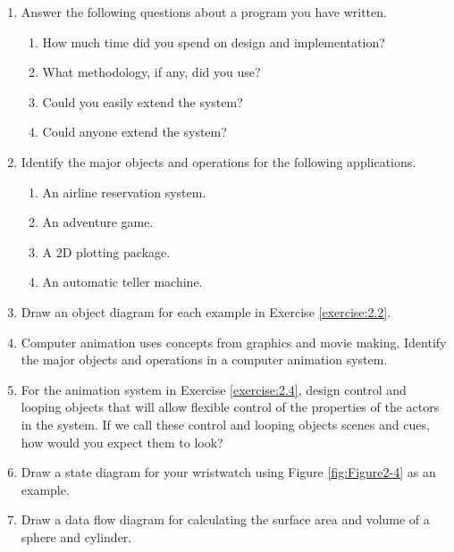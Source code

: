 \begin{enumerate}
	\item Answer the following questions about a program you have written.
	\begin{enumerate}
		\item How much time did you spend on design and implementation?
		\item What methodology, if any, did you use?
		\item Could you easily extend the system?
		\item Could anyone extend the system?
	\end{enumerate}

	\item \label{exercise:2.2} Identify the major objects and operations for the following
	applications.
	\begin{enumerate}
		\item An airline reservation system.
		\item An adventure game.
		\item A 2D plotting package.
		\item An automatic teller machine.
	\end{enumerate}

\item Draw an object diagram for each example in Exercise \ref{exercise:2.2}.

\item \label{exercise:2.4}Computer animation uses concepts from graphics and movie making. Identify the major objects and operations in a computer animation system.

\item For the animation system in Exercise \ref{exercise:2.4}, design control and looping objects that will allow flexible control of the properties of the actors in the system. If we call these control and looping objects scenes and cues, how would you expect them to look?

\item Draw a state diagram for your wristwatch using Figure \ref{fig:Figure2-4} as an example.

\item Draw a data flow diagram for calculating the surface area and volume of a sphere and cylinder.

\end{enumerate}